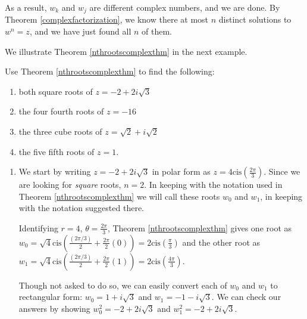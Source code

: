 \documentclass{ximera}
\begin{document}
 

As a result, $w_k$ and $w_j$ are different complex numbers, and we are done.  By Theorem  \ref{complexfactorization}, we know there at most $n$ distinct solutions to $w^{n} = z$, and we have just found all $n$ of them.   

 

We illustrate Theorem \ref{nthrootscomplexthm} in the next example.

\begin{example} \label{nthrootscomplexex}  Use Theorem \ref{nthrootscomplexthm} to find the following:

\begin{enumerate}

\item  both square roots of $z = -2  + 2i\sqrt{3}$

\item  \label{fourthrootsneg16} the four fourth roots of $z = -16$

\item  \label{halfanglecuberoot} the three cube roots of $z = \sqrt{2} + i \sqrt{2}$

\item  \label{calculatorfifthroot} the five fifth roots of $z = 1$.

\end{enumerate}

\begin{explanation}

\begin{enumerate}

\item  We start by writing $z= - 2 + 2i\sqrt{3}$ in polar form as $z = 4 \text{cis}\left(\frac{2\pi}{3}\right)$. Since we are looking for \textit{square} roots, $n=2$.  In keeping with the notation used in Theorem \ref{nthrootscomplexthm}  we will call these roots  $w_0$ and $w_1$, in keeping with the notation suggested there.  

 

 Identifying $r =4$,  $\theta = \frac{2\pi}{3}$, Theorem \ref{nthrootscomplexthm} gives  one root as $w_0 = \sqrt{4} \text{cis}\left(\frac{(2\pi/3)}{2} + \frac{2\pi}{2} (0)\right) = 2\text{cis}\left(\frac{\pi}{3}\right)$ and the other root as $w_1 = \sqrt{4} \text{cis}\left(\frac{(2\pi/3)}{2} + \frac{2\pi}{2} (1)\right) = 2\text{cis}\left(\frac{4\pi}{3}\right)$.   
 
  
 
 Though not asked to do so, we can easily convert each of $w_0$ and $w_1$ to  rectangular form:  $w_0  =  1+i\sqrt{3}$ and $w_1  = -1-i\sqrt{3}$.  We can check our answers by showing $w_0^2= -2 + 2i\sqrt{3}$ and $w_1^2= -2 + 2i\sqrt{3}$.


\end{enumerate}
\end{explanation}
\end{example}
\end{document}
